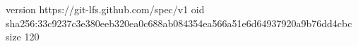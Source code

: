 version https://git-lfs.github.com/spec/v1
oid sha256:33c9237c3e380eeb320ea0c688ab084354ea566a51e6d64937920a9b76dd4cbc
size 120
